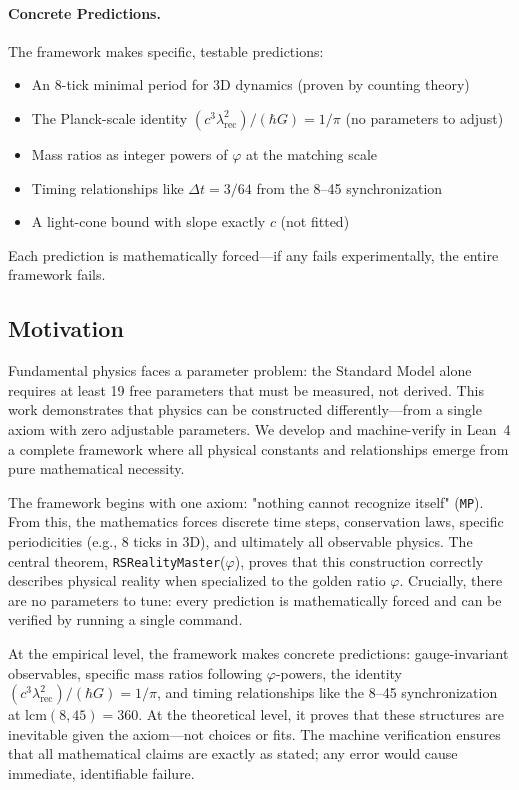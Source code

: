 \documentclass[11pt,a4paper,twoside]{article}
\numberwithin{equation}{section}
\theoremstyle{customthm}
\theoremstyle{customdef}
\theoremstyle{customrem}
\begin{document}
\paragraph{Concrete Predictions.} The framework makes specific, testable predictions:
\begin{itemize}[leftmargin=*,topsep=2pt,itemsep=2pt]
\item An 8-tick minimal period for 3D dynamics (proven by counting theory)
\item The Planck-scale identity $(c^3\lambda_{\mathrm{rec}}^2)/(\hbar G) = 1/\pi$ (no parameters to adjust)
\item Mass ratios as integer powers of $\varphi$ at the matching scale
\item Timing relationships like $\Delta t = 3/64$ from the 8--45 synchronization
\item A light-cone bound with slope exactly $c$ (not fitted)
\end{itemize}
Each prediction is mathematically forced—if any fails experimentally, the entire framework fails.

\subsection{Motivation}

Fundamental physics faces a parameter problem: the Standard Model alone requires at least 19 free parameters that must be measured, not derived. This work demonstrates that physics can be constructed differently—from a single axiom with zero adjustable parameters. We develop and machine-verify in Lean~4 a complete framework where all physical constants and relationships emerge from pure mathematical necessity.

The framework begins with one axiom: "nothing cannot recognize itself" (\texttt{MP}). From this, the mathematics forces discrete time steps, conservation laws, specific periodicities (e.g., 8 ticks in 3D), and ultimately all observable physics. The central theorem, \texttt{RSRealityMaster}($\varphi$), proves that this construction correctly describes physical reality when specialized to the golden ratio $\varphi$. Crucially, there are no parameters to tune: every prediction is mathematically forced and can be verified by running a single command.

At the empirical level, the framework makes concrete predictions: gauge-invariant observables, specific mass ratios following $\varphi$-powers, the identity $(c^3\lambda_{\mathrm{rec}}^2)/(\hbar G) = 1/\pi$, and timing relationships like the 8--45 synchronization at lcm$(8,45)=360$. At the theoretical level, it proves that these structures are inevitable given the axiom—not choices or fits. The machine verification ensures that all mathematical claims are exactly as stated; any error would cause immediate, identifiable failure.
\end{document}
